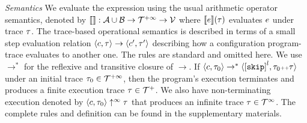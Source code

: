 

\emph{Semantics}
We evaluate the expression using the usual arithmetic operator semantics, denoted by
$\llbracket  \rrbracket : \mathcal{A} \cup \mathcal{B} \to \mathcal{T}^{+\infty} \to \mathcal{V}$ where
$\llbracket e \rrbracket(\mathtt{\tau})$ evaluates $e$ under trace $\mathtt{\tau}$.
The trace-based operational semantics is described in terms of a small step evaluation relation $\langle c, \mathtt{\tau} \rangle \to \langle c', \mathtt{\tau}' \rangle$ describing how a configuration program-trace evaluates to another
one.
The rules are standard and omitted here.
We use $\to^*$ for the reflexive and transitive closure of $\to$. 
If $\config{c, \trace_0} \rightarrow^{*} \config{\clabel{\eskip}^l, \trace_0 \tracecat \trace}$ under an initial trace 
$\mathtt{\tau}_0 \in \mathcal{T}^{+\infty}$,
then the program's execution terminates and produces a finite execution trace $\mathtt{\tau} \in \mathcal{T}^{+}$. We also have non-terminating execution denoted by $\langle c, \mathtt{\tau}_0 \rangle \uparrow^{\infty} \mathtt{\tau}$ that produces an infinite trace $\mathtt{\tau} \in \mathcal{T}^{\infty}$. The complete rules and definition can be found in the supplementary materials.
